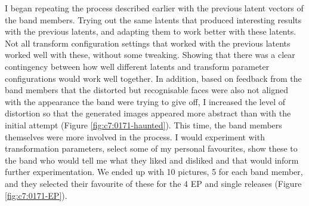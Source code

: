 I began repeating the process described earlier with the previous latent vectors of the band members. 
Trying out the same latents that produced interesting results with the previous latents, and adapting them to work better with these latents. 
Not all transform configuration settings that worked with the previous latents worked well with these, without some tweaking. 
Showing that there was a clear contingency between how well different latents and transform parameter configurations would work well together.
In addition, based on feedback from the band members that the distorted but recognisable faces were also not aligned with the appearance the band were trying to give off, I increased the level of distortion so that the generated images appeared more abstract than with the initial attempt (Figure \ref{fig:c7:0171-haunted}). 
This time, the band members themselves were more involved in the process. I would experiment with transformation parameters, select some of my personal favourites, show these to the band who would tell me what they liked and disliked and that would inform further experimentation. 
We ended up with 10 pictures, 5 for each band member, and they selected their favourite of these for the 4 EP and single releases (Figure \ref{fig:c7:0171-EP}). 

